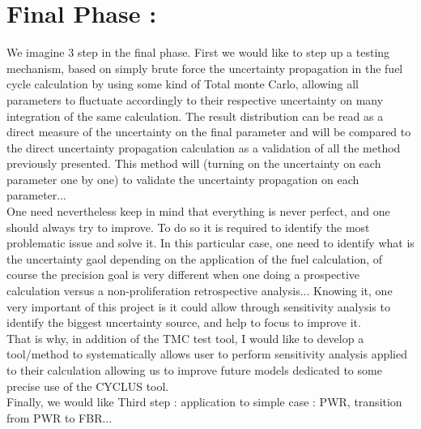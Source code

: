 \documentclass[dvips,12pt]{article}
\begin{document}
\section{Final Phase :}
We imagine 3 step in the final phase. First we would like to step up a testing mechanism, based on simply brute force the uncertainty propagation in the fuel cycle calculation by using some kind of Total monte Carlo, allowing all parameters to fluctuate accordingly to their respective uncertainty on many integration of the same calculation. The result distribution can be read as a direct measure of the uncertainty on the final parameter and will be compared to the direct uncertainty propagation calculation as a validation of all the method previously presented. This method will (turning on the uncertainty on each parameter one by one) to validate the uncertainty propagation on each parameter...\\
One need nevertheless keep in mind that everything is never perfect, and one should always try to improve. To do so it is required to identify the most problematic issue and solve it. In this particular case, one need to identify what is the uncertainty gaol depending on the application of the fuel calculation, of course the precision goal is very different when one doing a prospective calculation versus a non-proliferation retrospective analysis... Knowing it, one very important of this project is it could allow through sensitivity analysis to identify the biggest uncertainty source, and help to focus to improve it.\\
That is why, in addition of the TMC test tool, I would like to develop a tool/method to systematically allows user to perform sensitivity analysis applied to their calculation allowing us to improve future models dedicated to some precise use of the CYCLUS tool.\\


Finally, we would like
Third step : application to simple case : PWR, transition from PWR to FBR...










\end{document}
